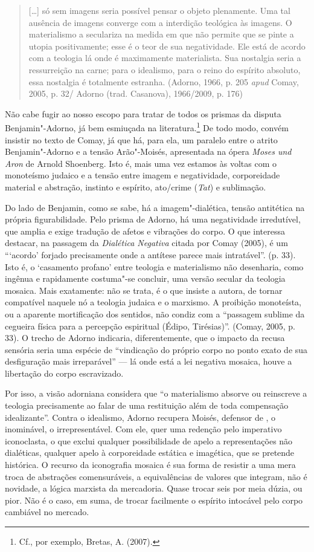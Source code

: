 \begin{quote}
{[}\ldots{}{]} só sem imagens seria possível pensar o objeto plenamente. Uma
tal ausência de imagens converge com a interdição teológica às imagens.
O materialismo a seculariza na medida em que não permite que se pinte a
utopia positivamente; esse é o teor de sua negatividade. Ele está de
acordo com a teologia lá onde é maximamente materialista. Sua nostalgia
seria a ressurreição na carne; para o idealismo, para o reino do
espírito absoluto, essa nostalgia é totalmente estranha. (Adorno, 1966,
p. 205 \emph{apud} Comay, 2005, p. 32/ Adorno (trad. Casanova),
1966/2009, p. 176)
\end{quote}

Não cabe fugir ao nosso escopo para tratar de todos os prismas da
disputa Benjamin"-Adorno, já bem esmiuçada na literatura.\footnote{Cf.,
  por exemplo, Bretas, A. (2007).} De todo modo, convém insistir no
texto de Comay, já que há, para ela, um paralelo entre o atrito
Benjamin"-Adorno e a tensão Arão"-Moisés, apresentada na ópera \emph{Moses
und Aron} de Arnold Shoenberg. Isto é, mais uma vez estamos às voltas
com o monoteísmo judaico e a tensão entre imagem e negatividade,
corporeidade material e abstração, instinto e espírito, ato/crime
(\emph{Tat}) e sublimação.

Do lado de Benjamin, como se sabe, há a imagem"-dialética, tensão
antitética na própria figurabilidade. Pelo prisma de Adorno, há uma
negatividade irredutível, que amplia e exige tradução de afetos e
vibrações do corpo. O que interessa destacar, na passagem da
\emph{Dialética Negativa} citada por Comay (2005), é um ```acordo'
forjado precisamente onde a antítese parece mais intratável''. (p. 33).
Isto é, o `casamento profano' entre teologia e materialismo não
desenharia, como ingênua e rapidamente costuma"-se concluir, uma versão
secular da teologia mosaica. Mais exatamente: não se trata, é o que
insiste a autora, de tornar compatível naquele nó a teologia judaica e o
marxismo. A proibição monoteísta, ou a aparente mortificação dos
sentidos, não condiz com a ``passagem sublime da cegueira física para a
percepção espiritual (Édipo, Tirésias)''. (Comay, 2005, p. 33). O trecho
de Adorno indicaria, diferentemente, que o impacto da recusa sensória
seria uma espécie de ``vindicação do próprio corpo no ponto exato de sua
desfiguração mais irreparável'' --- lá onde está a lei negativa mosaica,
houve a libertação do corpo escravizado.

Por isso, a visão adorniana considera que ``o materialismo absorve ou
reinscreve a teologia precisamente ao falar de uma restituição além de
toda compensação idealizante''. Contra o idealismo, Adorno recupera
Moisés, defensor de , o inominável, o irrepresentável. Com ele, quer
uma redenção pelo imperativo iconoclasta, o que exclui qualquer
possibilidade de apelo a representações não dialéticas, qualquer apelo à
corporeidade estática e imagética, que se pretende histórica. O recurso
da iconografia mosaica é sua forma de resistir a uma mera troca de
abstrações comensuráveis, a equivalências de valores que integram, não é
novidade, a lógica marxista da mercadoria. Quase trocar seis por meia
dúzia, ou pior. Não é o caso, em suma, de trocar facilmente o espírito
intocável pelo corpo cambiável no mercado.

